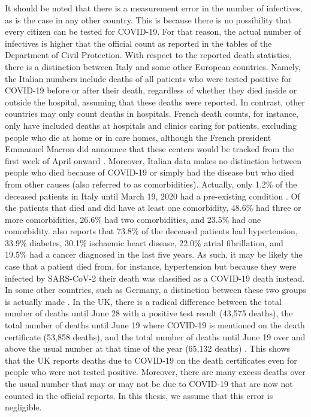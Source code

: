 \documentclass[12pt]{article}
\begin{document}
	It should be noted that there is a measurement error in the number of infectives, as is the case in any other country. This is because there is no possibility that every citizen can be tested for COVID-19. For that reason, the actual number of infectives is higher that the official count as reported in the tables of the Department of Civil Protection. With respect to the reported death statistics, there is a distinction between Italy and some other European countries. Namely, the Italian numbers include deaths of all patients who were tested positive for COVID-19 before or after their death, regardless of whether they died inside or outside the hospital, assuming that these deaths were reported. In contrast, other countries may only count deaths in hospitals. French death counts, for instance, only have included deaths at hospitals and clinics caring for patients, excluding people who die at home or in care homes, although the French president Emmanuel Macron did announce that these centers would be tracked from the first week of April onward \parencite{otherCountriesDeathsSevillano}. Moreover, Italian data makes no distinction between people who died because of COVID-19 or simply had the disease but who died from other causes (also referred to as comorbidities). Actually, only 1.2\% of the deceased patients in Italy until March 19, 2020 had a pre-existing condition \parencite{ecdc2020riskassessment}. Of the patients that died and did have at least one comorbidity, 48.6\% had three or more comorbidities, 26.6\% had two comorbidities, and 23.5\% had one comorbidity. \textcite{ecdc2020riskassessment} also reports that 73.8\% of the deceased patients had hypertension, 33.9\% diabetes, 30.1\% ischaemic heart disease, 22.0\% atrial fibrillation, and 19.5\% had a cancer diagnosed in the last five years. As such, it may be likely the case that a patient died from, for instance, hypertension but because they were infected by SARS-CoV-2 their death was classified as a COVID-19 death instead. In some other countries, such as Germany, a distinction between these two groups is actually made \parencite{otherCountriesDeathsCaccia}. In the UK, there is a radical difference between the total number of deaths until June 28 with a positive test result (43,575 deaths), the total number of deaths until June 19 where COVID-19 is mentioned on the death certificate (53,858 deaths), and the total number of deaths until June 19 over and above the usual number at that time of the year (65,132 deaths) \parencite{bbc2020deathrate}. This shows that the UK reports deaths due to COVID-19 on the death certificates even for people who were not tested positive. Moreover, there are many excess deaths over the usual number that may or may not be due to COVID-19 that are now not counted in the official reports. In this thesis, we assume that this error is negligible. \\
	
\end{document}
